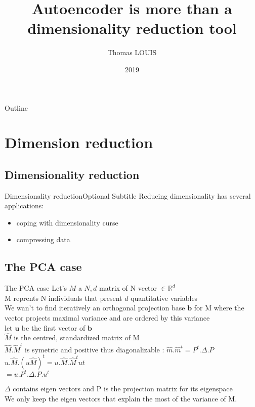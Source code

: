 \documentclass{beamer}
\title{Autoencoder is more than a dimensionality reduction tool}
\author{Thomas LOUIS}
\date{2019}
\newcommand{\reels}{\mathbb{R}}
\begin{document}
\begin{frame}
  \titlepage
\end{frame}

\begin{frame}{Outline}
  \tableofcontents
\end{frame}

\section{Dimension reduction}

\subsection{Dimensionality reduction}

\begin{frame}{Dimensionality reduction}{Optional Subtitle}
    Reducing dimensionality has several applications:
    \begin{itemize}
	    \item coping with dimensionality curse
	    \item compressing data
    \end{itemize}
\end{frame}

\subsection{The PCA case}
\begin{frame}{The PCA case}
    Let's $M$ a ${N, d}$ matrix  of N vector $\in \reels^{d}$\\
    M reprents N individuals that present $d$ quantitative variables \\
    We wan't to find iteratively an orthogonal projection base $\mathbf{b}$ for M where the vector projects maximal variance and are ordered by this variance \\
    let $\mathbf{u}$ be the first vector of $\mathbf{b}$ \\
    $\hat{M}$ is the centred, standardized matrix of M \\
    $\hat{M}.\hat{M}^{t}$ is symetric and positive thus diagonalizable : $\hat{m}.\hat{m}^{t} = P^{t}.\Delta.P$ \\
    $u.\hat{M} . (u\hat{M})^{t} = u.\hat{M}.\hat{M}^{t}u{t}$ \\
    $ = u. P^{t}.\Delta.P. u^{t} $

    $\Delta$ contains eigen vectors and P is the projection matrix for its eigenspace \\

    We only keep the eigen vectors that explain the most of the variance of M. \\
\end{frame}
\end{document}
